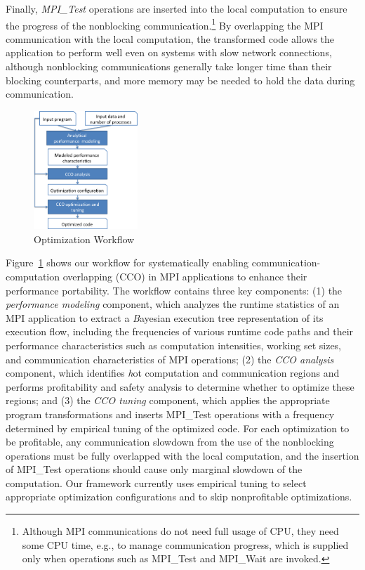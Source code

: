 Finally, \emph{MPI\_Test} operations are inserted into the local computation to
ensure the progress of the nonblocking
communication.\footnote{Although MPI communications do not need full
  usage of CPU, they need some CPU time, e.g., to manage communication
  progress, which is supplied only when operations such as MPI\_Test
  and MPI\_Wait are invoked.}  By overlapping the MPI communication
with the local computation, the transformed code allows the
application to perform well even on systems with slow network
connections, although nonblocking communications generally take longer
time than their blocking counterparts, and more memory may be needed to
hold the data during communication.

\begin{figure}[h]
\centering
\includegraphics[width=0.35\textwidth]{fig/framework.png} %
\caption{Optimization Workflow}
\label{fig:overview}
\end{figure}

Figure~\ref{fig:overview} shows our workflow for systematically
enabling communication-computation overlapping (CCO) in MPI
applications to enhance their performance portability.  The
workflow contains three key components: (1) the \emph{performance
  modeling} component, which analyzes the runtime statistics of an MPI
application to extract a {\emph Bayesian execution
  tree\cite{jichi:ipdps14}} representation of its execution flow,
including the frequencies of various runtime code paths and their
performance characteristics such as computation intensities, working
set sizes, and communication characteristics of MPI operations; (2)
the \emph{CCO analysis} component, which identifies {\emph hot}
computation and communication regions  
and performs profitability and safety
analysis to determine whether to optimize these regions; and (3) the \emph{CCO
  tuning} component, which applies the appropriate program
transformations 
and inserts MPI\_Test operations with a frequency
determined by empirical tuning of the optimized code.  
For each optimization to be profitable, any
communication slowdown from the use of the nonblocking operations must
be fully overlapped with the local computation, and the insertion of
MPI\_Test operations should cause only marginal slowdown of the computation.
Our framework currently
uses empirical tuning to select appropriate
optimization configurations and to skip nonprofitable optimizations.

